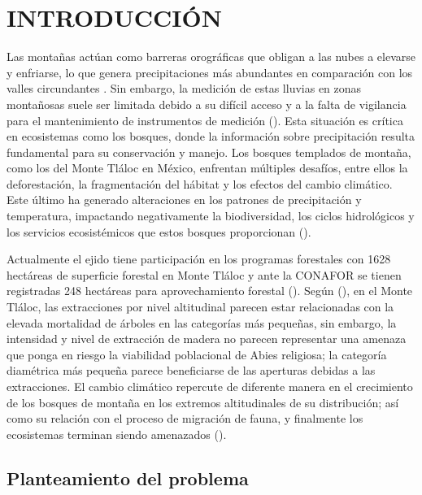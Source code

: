 \chapter{INTRODUCCIÓN}
\setcounter{page}{1}

Las montañas actúan como barreras orográficas que obligan a las nubes a elevarse y enfriarse, lo que genera precipitaciones más abundantes en comparación con los valles circundantes \cite{CruzMiranda2021}. Sin embargo, la medición de estas lluvias en zonas montañosas suele ser limitada debido a su difícil acceso y a la falta de vigilancia para el mantenimiento de instrumentos de medición (\cite{aparicio1992}). Esta situación es crítica en ecosistemas como los bosques, donde la información sobre precipitación resulta fundamental para su conservación y manejo. Los bosques templados de montaña, como los del Monte Tláloc en México, enfrentan múltiples desafíos, entre ellos la deforestación, la fragmentación del hábitat y los efectos del cambio climático. Este último ha generado alteraciones en los patrones de precipitación y temperatura, impactando negativamente la biodiversidad, los ciclos hidrológicos y los servicios ecosistémicos que estos bosques proporcionan (\cite{gonzalez2016}).

Actualmente el ejido tiene participación en los programas forestales con 1628 hectáreas de superficie forestal en Monte Tláloc y ante la CONAFOR se tienen registradas 248 hectáreas para aprovechamiento forestal (\cite{nava2014}). Según (\cite{lopez2023}), en el Monte Tláloc, las extracciones por nivel altitudinal parecen estar relacionadas con la elevada mortalidad de árboles en las categorías más pequeñas, sin embargo, la intensidad y nivel de extracción de madera no parecen representar una amenaza que ponga en riesgo la viabilidad poblacional de Abies religiosa; la categoría diamétrica más pequeña parece beneficiarse de las aperturas debidas a las extracciones. El cambio climático repercute de diferente manera en el crecimiento de los bosques de montaña en los extremos altitudinales de su distribución; así como su relación con el proceso de migración de fauna, y finalmente los ecosistemas terminan siendo amenazados (\cite{hernandez2021}).



\newpage
\section{Planteamiento del problema}

